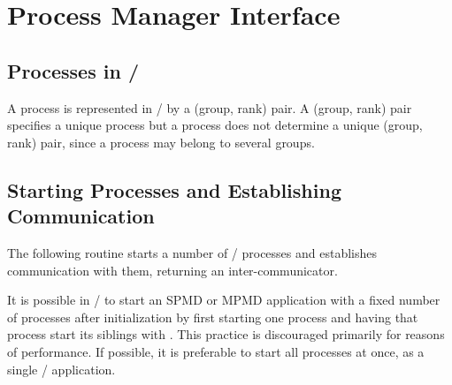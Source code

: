 \section{Process Manager Interface}
\label{sec:processes}


\subsection{Processes in \texorpdfstring{\MPI/}{MPI}}

A process is represented in \MPI/ by a (group, rank) pair.
A (group, rank) pair specifies a unique process but
a process does not determine a unique (group, rank) pair, since
a process may belong to several groups.

\subsection{Starting Processes and Establishing Communication}


The following routine starts a number of \MPI/ processes and
establishes communication with them, returning an inter-communicator.

\begin{users}
It is possible in \MPI/ to start an SPMD or MPMD application with a fixed number of processes
after initialization by
first starting one process and having
that process start its siblings
with . This practice is discouraged primarily for
reasons of performance.  If possible, it is preferable to start all
processes at once, as a single
\mpi/
application.
\end{users}

